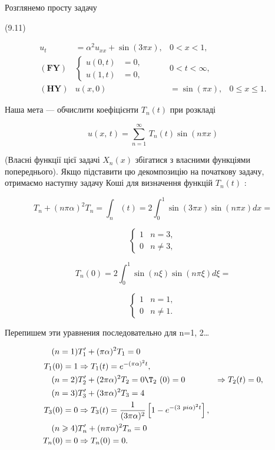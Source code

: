 \documentclass[
  ukrainian,
]{article}
\begin{document}
Розглянемо просту задачу

(9.11)

\[
\begin{aligned} u_t &= \alpha^2 u_{xx} + \sin{(3\pi x)}, & 0 < x < 1, \\ (\mathbf{FY}) & \begin{cases} u(0, t) &= 0, \\ u(1, t) &= 0, \end{cases} & 0 < t < \infty, \\ (\mathbf{HY}) & u(x, 0) &= \sin{(\pi x)}, & 0 \leq x \leq 1. \end{aligned}
\]

Наша мета --- обчислити коефіцієнти \(T_n(t)\) при розкладі

\[
u\left(x,\,t\right)=\sum_{n=1}^{\infty}\,T_{n}\left(t\right)\sin\left(n\pi x\right)
\]

(Власні функції цієї задачі \(X_n(x)\) збігатися з власними функціями
попереднього). Якщо підставити цю декомпозицію на початкову задачу,
отримаємо наступну задачу Коші для визначення функцій \(T_n(t)\) :

\[
T_n + (n\pi\alpha)^2 T_n = \int_n (t) = 2 \int_0^1 \sin(3\pi x) \sin(n\pi x) dx =
\]

\[
\begin{cases} 1 &n = 3, \\ 0 & n \neq 3, \end{cases}
\]

\[
T_n(0) = 2 \int_0^1 \sin(n\xi) \sin(n\pi\xi) d\xi =
\]

\[
\begin{cases} 1 &n = 1, \\ 0 & n \neq 1. \end{cases}
\]

Перепишем эти уравнения последовательно для n=1, 2\ldots{}

\[
\begin{aligned} (n=1) & T_1' + (\pi\alpha)^2 T_1 = 0 \\ T_1(0) = 1 & \Rightarrow T_1(t) = e^{-(\pi\alpha)^2 t}, \\ (n=2) & T_2' + (2\pi\alpha)^2 T_2 = 0 \T_2\  (0) = 0 & \Rightarrow T_2(t) = 0, \\ (n=3) & T_3' + (3\pi\alpha)^2 T_3 = 4 \\ T_3(0) = 0 & \Rightarrow T_3(t) = \frac{1}{(3\pi\alpha)^2} \left[1 - e^{-(3\ pi\alpha)^2 t}\right], \\ (n \geqslant 4) & T_n' + (n\pi\alpha)^2 T_n = 0 \\ T_n(0) = 0 & \Rightarrow T_n(0) = 0. \end{aligned}
\]
\end{document}
